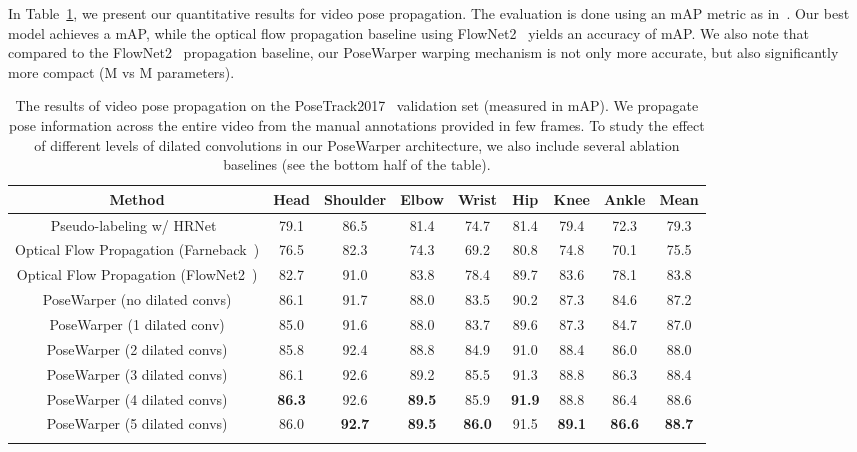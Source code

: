 \documentclass{article}
\begin{document}
In Table~\ref{pose_propagation_table}, we present our quantitative results for video pose propagation. The evaluation is done using an mAP metric as in~\cite{insafutdinov2016deepercut}. Our best model achieves a  mAP, while the optical flow propagation baseline using FlowNet2~\cite{DBLP:journals/corr/IlgMSKDB16} yields an accuracy of  mAP.  We also note that compared to the FlowNet2~\cite{DBLP:journals/corr/IlgMSKDB16} propagation baseline, our PoseWarper warping mechanism is not only more accurate, but also significantly more compact (M vs M parameters).

















\begin{table}[!t]
\caption{The results of video pose propagation on the PoseTrack2017~\cite{Iqbal_CVPR2017} validation set (measured in mAP). We propagate pose information across the entire video from the manual annotations provided in few frames. To study the effect of different levels of dilated convolutions in our PoseWarper architecture, we also include several ablation baselines (see the bottom half of the table).} \label{pose_propagation_table}
\setlength{\tabcolsep}{2.0pt}
\footnotesize
\begin{center}
 \begin{tabular}{c c  c  c  c  c  c  c | c } 
 \hline
 Method & Head & Shoulder & Elbow &  Wrist & Hip &  Knee & Ankle & Mean\\
 \hline Pseudo-labeling w/ HRNet~\cite{sun2019deep} & 79.1 & 86.5 & 81.4 & 74.7 & 81.4 & 79.4 & 72.3 &  79.3\\
Optical Flow Propagation (Farneback~\cite{Farneback:2003:TME:1763974.1764031}) & 76.5 & 82.3 & 74.3 & 69.2 & 80.8 & 74.8 & 70.1 & 75.5\\
  Optical Flow Propagation (FlowNet2~\cite{DBLP:journals/corr/IlgMSKDB16}) & 82.7 & 91.0 & 83.8 & 78.4 & 89.7 & 83.6 & 78.1 &  83.8\\ \hline
PoseWarper (no dilated convs) & 86.1 & 91.7 & 88.0 & 83.5 & 90.2 & 87.3 & 84.6 & 87.2\\
  PoseWarper (1 dilated conv) & 85.0 & 91.6 & 88.0 & 83.7 & 89.6 & 87.3 & 84.7 & 87.0\\
  PoseWarper (2 dilated convs) & 85.8 & 92.4 & 88.8 & 84.9 & 91.0 & 88.4 & 86.0 & 88.0\\
  PoseWarper (3 dilated convs) & 86.1 & 92.6 & 89.2 & 85.5 & 91.3 & 88.8 & 86.3 & 88.4\\
  PoseWarper (4 dilated convs) & \bf 86.3 & 92.6 & \bf 89.5 & 85.9 & \bf 91.9 & 88.8 & 86.4 & 88.6\\
  PoseWarper (5 dilated convs) & 86.0 & \bf 92.7 & \bf 89.5 & \bf 86.0 & 91.5 & \bf 89.1 & \bf 86.6 & \bf 88.7\\
\hline
  \vspace{-0.4cm}
\end{tabular}
\end{center}
\end{table}
\end{document}
